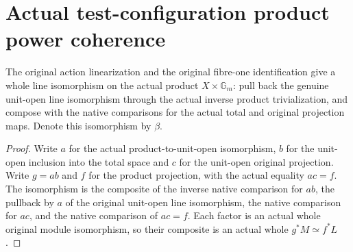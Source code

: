 \section{Actual test-configuration product power coherence}

\begin{definition}\label{def:native-tc-product-original-line-iso}
\leanok
{}
The original action linearization and the original fibre-one
identification give a whole line isomorphism on the actual product
$X\times\mathbb G_m$: pull back the genuine unit-open line
isomorphism through the actual inverse product trivialization,
and compose with the native comparisons for the actual total and
original projection maps. Denote this isomorphism by $\beta$.
\end{definition}
\begin{proof}
Write $a$ for the actual product-to-unit-open isomorphism, $b$ for
the unit-open inclusion into the total space and $c$ for the
unit-open original projection. Write $g=ab$ and $f$ for the product
projection, with the actual equality $ac=f$. The isomorphism is
the composite of the inverse native comparison for $ab$, the
pullback by $a$ of the original unit-open line isomorphism, the
native comparison for $ac$, and the native comparison of $ac=f$.
Each factor is an actual whole original module isomorphism, so
their composite is an actual whole $g^*M\simeq f^*L$.
\end{proof}

